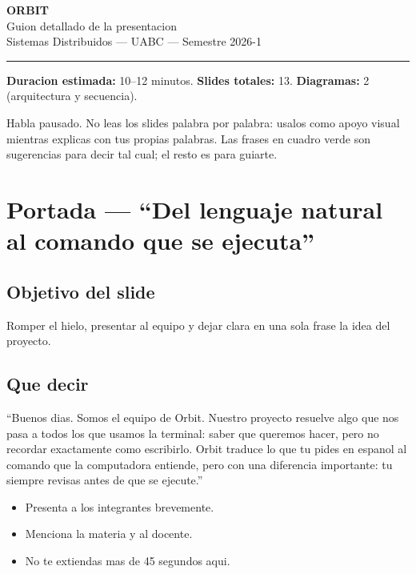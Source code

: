 \documentclass[12pt,a4paper]{article}
\begin{document}
\begin{center}
  {\Huge\bfseries\color{esmeralda} ORBIT}\\[6pt]
  {\large Guion detallado de la presentacion}\\[2pt]
  {\small Sistemas Distribuidos --- UABC --- Semestre 2026-1}\\[10pt]
  \rule{0.6\linewidth}{0.4pt}
\end{center}

\vspace{0.5em}

\noindent\textbf{Duracion estimada:} 10--12 minutos. \quad
\textbf{Slides totales:} 13. \quad
\textbf{Diagramas:} 2 (arquitectura y secuencia).

\begin{tipbox}
Habla pausado. No leas los slides palabra por palabra: usalos como apoyo visual mientras explicas con tus propias palabras. Las frases en cuadro verde son sugerencias para decir tal cual; el resto es para guiarte.
\end{tipbox}

\section{Portada --- ``Del lenguaje natural al comando que se ejecuta''}
\subsection{Objetivo del slide}
Romper el hielo, presentar al equipo y dejar clara en una sola frase la idea del proyecto.

\subsection{Que decir}
\begin{frasebox}
``Buenos dias. Somos el equipo de Orbit. Nuestro proyecto resuelve algo que nos pasa a todos los que usamos la terminal: saber que queremos hacer, pero no recordar exactamente como escribirlo. Orbit traduce lo que tu pides en espanol al comando que la computadora entiende, pero con una diferencia importante: tu siempre revisas antes de que se ejecute.''
\end{frasebox}

\begin{itemize}
  \item Presenta a los integrantes brevemente.
  \item Menciona la materia y al docente.
  \item No te extiendas mas de 45 segundos aqui.
\end{itemize}
\end{document}
